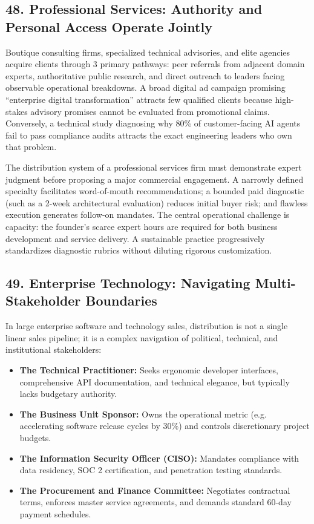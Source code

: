 \subsection*{48. Professional Services: Authority and Personal Access Operate Jointly}

Boutique consulting firms, specialized technical advisories, and elite agencies acquire clients through 3 primary pathways: peer referrals from adjacent domain experts, authoritative public research, and direct outreach to leaders facing observable operational breakdowns. A broad digital ad campaign promising ``enterprise digital transformation'' attracts few qualified clients because high-stakes advisory promises cannot be evaluated from promotional claims. Conversely, a technical study diagnosing why 80\% of customer-facing AI agents fail to pass compliance audits attracts the exact engineering leaders who own that problem.

The distribution system of a professional services firm must demonstrate expert judgment before proposing a major commercial engagement. A narrowly defined specialty facilitates word-of-mouth recommendations; a bounded paid diagnostic (such as a 2-week architectural evaluation) reduces initial buyer risk; and flawless execution generates follow-on mandates. The central operational challenge is capacity: the founder's scarce expert hours are required for both business development and service delivery. A sustainable practice progressively standardizes diagnostic rubrics without diluting rigorous customization.

\subsection*{49. Enterprise Technology: Navigating Multi-Stakeholder Boundaries}

In large enterprise software and technology sales, distribution is not a single linear sales pipeline; it is a complex navigation of political, technical, and institutional stakeholders:
\begin{itemize}[leftmargin=*,itemsep=1pt]
  \item \textbf{The Technical Practitioner:} Seeks ergonomic developer interfaces, comprehensive API documentation, and technical elegance, but typically lacks budgetary authority.
  \item \textbf{The Business Unit Sponsor:} Owns the operational metric (e.g. accelerating software release cycles by 30\%) and controls discretionary project budgets.
  \item \textbf{The Information Security Officer (CISO):} Mandates compliance with data residency, SOC 2 certification, and penetration testing standards.
  \item \textbf{The Procurement and Finance Committee:} Negotiates contractual terms, enforces master service agreements, and demands standard 60-day payment schedules.
\end{itemize}

